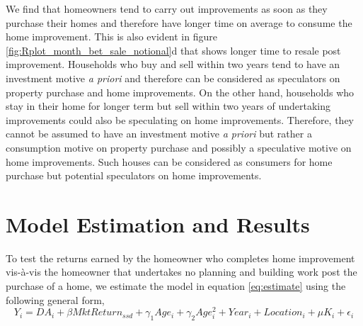 \documentclass[AEJ,reqno, draftmode]{AEA} %
\begin{document}
We find that homeowners tend to carry out improvements as soon as they purchase their homes and therefore have longer time on average to consume the home improvement. This is also evident in figure \ref{fig:Rplot_month_bet_sale_notional}d that shows longer time to resale post improvement. Households who buy and sell within two years tend to have an investment motive \textit{a priori} and therefore can be considered as speculators on property purchase and home improvements. On the other hand, households who stay in their home for longer term but sell within two years of undertaking improvements could also be speculating on home improvements. Therefore, they cannot be assumed to have an investment motive \textit{a priori} but rather a consumption motive on property purchase and possibly a speculative motive on home improvements. Such houses can be considered as consumers for home purchase but potential speculators on home improvements.






\section{Model Estimation and Results}


To test the returns earned by the homeowner who completes home improvement vis-à-vis the homeowner that undertakes no planning and building work post the purchase of a home, we estimate the model in equation \ref{eq:estimate} using the following general form,
\begin{equation}
    Y_i = DA_i + \beta{MktReturn_{ssd}} + \gamma_1{Age_i} + \gamma_2{Age_i^2} + Year_i + Location_i + \mu{K_i} + \epsilon_i
\end{equation}
\end{document}
